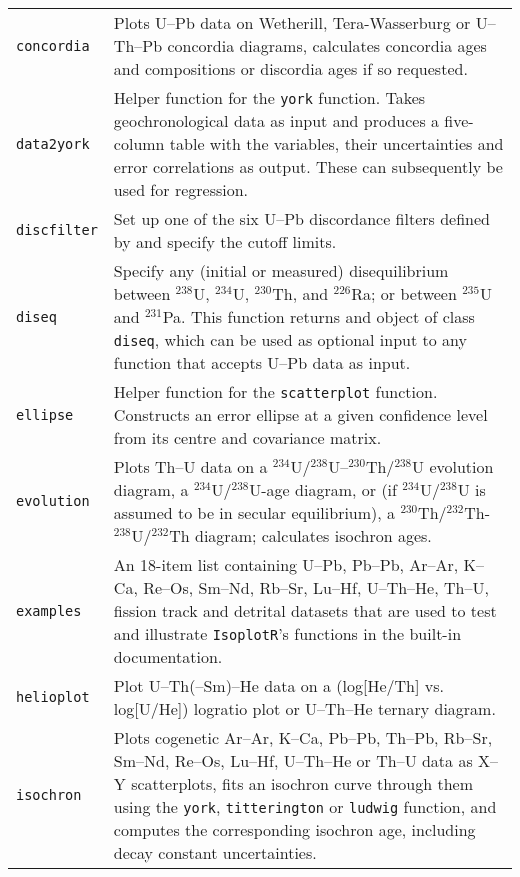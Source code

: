 \begin{refsection}
\begin{longtable}{@{}p{.25\linewidth}@{}p{.75\linewidth}@{}}
\texttt{concordia} & Plots U--Pb data on Wetherill, Tera-Wasserburg or
U--Th--Pb concordia diagrams, calculates concordia ages and
compositions or discordia ages if so requested.\\

\texttt{data2york} & Helper function for the \texttt{york}
function. Takes geochronological data as input and produces a
five-column table with the variables, their uncertainties and error
correlations as output. These can subsequently be used for
\citet{york2004} regression.\\

\texttt{discfilter} & Set up one of the six U--Pb discordance filters
defined by \citet{vermeesch2021} and specify the cutoff limits.\\

\texttt{diseq} & Specify any (initial or measured) disequilibrium
between $^{238}$U, $^{234}$U, $^{230}$Th, and $^{226}$Ra; or between
$^{235}$U and $^{231}$Pa. This function returns and object of class
\texttt{diseq}, which can be used as optional input to any function
that accepts U--Pb data as input.\\

\texttt{ellipse} & Helper function for the \texttt{scatterplot}
function. Constructs an error ellipse at a given confidence level from
its centre and covariance matrix. \\

\texttt{evolution} & Plots Th--U data on a
$^{234}$U/$^{238}$U--$^{230}$Th/$^{238}$U evolution diagram, a
$^{234}$U/$^{238}$U-age diagram, or (if $^{234}$U/$^{238}$U is assumed
to be in secular equilibrium), a
$^{230}$Th/$^{232}$Th-$^{238}$U/$^{232}$Th diagram; calculates
isochron ages.\\

\texttt{examples} & An 18-item list containing U--Pb, Pb--Pb, Ar--Ar,
K--Ca, Re--Os, Sm--Nd, Rb--Sr, Lu--Hf, U--Th--He, Th--U, fission track
and detrital datasets that are used to test and illustrate
\texttt{IsoplotR}'s functions in the built-in documentation.\\

\texttt{helioplot} & Plot U--Th(--Sm)--He data on a (log[He/Th]
vs. log[U/He]) logratio plot or U--Th--He ternary diagram.\\

\texttt{isochron} & Plots cogenetic Ar--Ar, K--Ca, Pb--Pb, Th--Pb,
Rb--Sr, Sm--Nd, Re--Os, Lu--Hf, U--Th--He or Th--U data as X--Y
scatterplots, fits an isochron curve through them using the
\texttt{york}, \texttt{titterington} or \texttt{ludwig} function, and
computes the corresponding isochron age, including decay constant
uncertainties.\\


\end{longtable}
\end{refsection}
